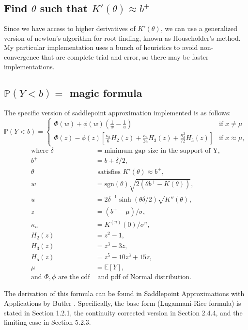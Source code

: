\documentclass[a4paper,11pt]{article}
\begin{document}
\subsection{Find $\theta$ such that $K'(\theta) \approx b^+$}

Since we have access to higher derivatives of $K'(\theta)$, we can use a generalized version of newton's algorithm for root finding, known as Householder's method. My particular implementation uses a bunch of heuristics to avoid non-convergence that are complete trial and error, so there may be faster implementations.

\newpage
\subsection{$\mathbb{P}(Y<b) = $ magic formula}

The specific version of saddlepoint approximation implemented is as follows:
$$
\mathbb{P}(Y<b) = \begin{cases}\Phi(w) + \phi( w) (\frac{1}{w} - \frac{1}{ u})& \text{if } x \neq \mu  \\

\Phi(z) - \phi(z) \left[ \frac{\kappa_3}{6} H_2(z) + \frac{\kappa_4}{24} H_3(z) + \frac{\kappa_3^2}{72} H_5(z) \right] & \text{if } x \approx \mu, 
\end{cases}
$$
\begin{align*}
\text{where } 
  \delta &= \text{minimum gap size in the support of Y}, \\
  b^+ &= b + \delta/2, \\
\theta &  \text{ satisfies }K'(\theta) \approx b^+, \\
w &=  \text{sgn}(\theta)\sqrt{2 (\theta b^+-K(\theta))}, \\
 u &= 2  \delta^{-1}\sinh(\theta\delta/2)\sqrt{K''(\theta)}, \\
 z &= (b^+ - \mu)/\sigma,\\
 \kappa_n &= K^{(n)}(0)/\sigma^n, \\
  H_2(z) &= z^2-1, \\
  H_3(z) &= z^3-3z, \\
  H_5(z) &= z^5-10z^3+15z, \\
  \mu &= \mathbb{E}[Y], \\
 \text{and } \Phi, \phi \text{ are the cdf} & \text{ and pdf of Normal distribution.} 
\end{align*}

\noindent
The derivation of this formula can be found in Saddlepoint Approximations with Applications by Butler \cite{butler2007saddlepoint}. Specifically, the base form (Lugannani-Rice formula) is stated in Section 1.2.1, the continuity corrected version in Section 2.4.4, and the limiting case in Section 5.2.3.
\end{document}
